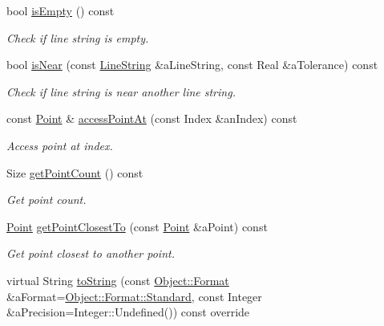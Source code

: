 \begin{DoxyCompactItemize}
bool \hyperlink{classlibrary_1_1math_1_1geom_1_1d2_1_1objects_1_1_line_string_a4cdb4e69cd076285cb14356b86b41fcf}{is\+Empty} () const
\begin{DoxyCompactList}\small\item\em Check if line string is empty. \end{DoxyCompactList}\item 
bool \hyperlink{classlibrary_1_1math_1_1geom_1_1d2_1_1objects_1_1_line_string_a306598a5dca56802f094c57465a4d551}{is\+Near} (const \hyperlink{classlibrary_1_1math_1_1geom_1_1d2_1_1objects_1_1_line_string}{Line\+String} \&a\+Line\+String, const Real \&a\+Tolerance) const
\begin{DoxyCompactList}\small\item\em Check if line string is near another line string. \end{DoxyCompactList}\item 
const \hyperlink{classlibrary_1_1math_1_1geom_1_1d2_1_1objects_1_1_point}{Point} \& \hyperlink{classlibrary_1_1math_1_1geom_1_1d2_1_1objects_1_1_line_string_af3978277bde56a5bfec46d5f2ebd3e59}{access\+Point\+At} (const Index \&an\+Index) const
\begin{DoxyCompactList}\small\item\em Access point at index. \end{DoxyCompactList}\item 
Size \hyperlink{classlibrary_1_1math_1_1geom_1_1d2_1_1objects_1_1_line_string_a950ceda32b44a6f2e49c1e36bc4f4dc2}{get\+Point\+Count} () const
\begin{DoxyCompactList}\small\item\em Get point count. \end{DoxyCompactList}\item 
\hyperlink{classlibrary_1_1math_1_1geom_1_1d2_1_1objects_1_1_point}{Point} \hyperlink{classlibrary_1_1math_1_1geom_1_1d2_1_1objects_1_1_line_string_a038dba8bffbcaaf498a349341458db4a}{get\+Point\+Closest\+To} (const \hyperlink{classlibrary_1_1math_1_1geom_1_1d2_1_1objects_1_1_point}{Point} \&a\+Point) const
\begin{DoxyCompactList}\small\item\em Get point closest to another point. \end{DoxyCompactList}\item 
virtual String \hyperlink{classlibrary_1_1math_1_1geom_1_1d2_1_1objects_1_1_line_string_a13c0a7c5b8da7724b5a2dd2933064768}{to\+String} (const \hyperlink{classlibrary_1_1math_1_1geom_1_1d2_1_1_object_ac8cd61dada4960cfee9a469231621b17}{Object\+::\+Format} \&a\+Format=\hyperlink{classlibrary_1_1math_1_1geom_1_1d2_1_1_object_ac8cd61dada4960cfee9a469231621b17aeb6d8ae6f20283755b339c0dc273988b}{Object\+::\+Format\+::\+Standard}, const Integer \&a\+Precision=Integer\+::\+Undefined()) const override

\end{DoxyCompactItemize}
